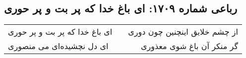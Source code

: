 \begin{center}
\section*{رباعی شماره ۱۷۰۹: ای باغ خدا که پر بت و پر حوری}
\label{sec:1709}
\begin{longtable}{l p{0.5cm} r}
ای باغ خدا که پر بت و پر حوری
&&
از چشم خلایق اینچنین چون دوری
\\
ای دل نچشیده‌ای می منصوری
&&
گر منکر آن باغ شوی معذوری
\\
\end{longtable}
\end{center}
